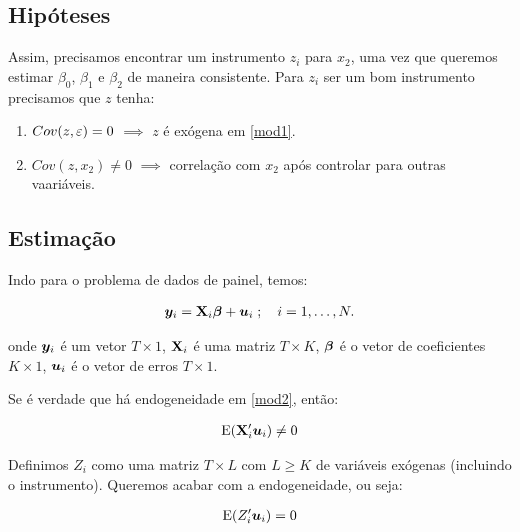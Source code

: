 \documentclass[11pt, oneside, a4paper, article]{article}
\numberwithin{equation}{section}
\begin{document}
\begin{description}
\begin{description}
\subsection*{Hipóteses}

Assim, precisamos encontrar um instrumento $z_{i}$ para $x_{2}$, uma vez que queremos estimar $\beta_{0}$, $\beta_{1}$ e $\beta_{2}$ de maneira consistente.
Para $z_{i}$ ser um bom instrumento precisamos que $z$ tenha:

\begin{enumerate}\itemsep0pt
\item $Cov(z, \varepsilon) = 0$ $\implies$  $z$ é exógena em \eqref{mod1}.
\item $Cov(z, x_{2}) \neq 0$ $\implies$  correlação com $x_{2}$ após controlar para outras vaariáveis.
\end{enumerate}

\subsection*{Estimação}

Indo para o problema de dados de painel, temos:

\vspace{-1 em}
\begin{align} \label{mod2}
	\boldsymbol{y}_{i} = \mathbf{X}_{i} \boldsymbol{\beta} + \boldsymbol{u}_{i}
	\; ; \quad i = 1, \dots, N.
\end{align}

\noindent
onde 
$\boldsymbol{y}_{i}$ é um vetor $T \times 1$,
$\mathbf{X}_{i}$ é uma matriz $T \times K$,
$\boldsymbol{\beta}$ é o vetor de coeficientes $K \times 1$,
$\boldsymbol{u}_{i}$ é o vetor de erros $T \times 1$.

Se é verdade que há endogeneidade em \eqref{mod2}, então:

\vspace{-1 em}
\begin{align*}
	\text{E}(\mathbf{X}_{i}^{\prime} \boldsymbol{u}_{i}) \neq 0
\end{align*}

Definimos $Z_{i}$ como uma matriz $T \times L$ com $L \geq K$ de variáveis exógenas (incluindo o instrumento).
Queremos acabar com a endogeneidade, ou seja:

\vspace{-1 em}
\begin{align*}
	\text{E}(Z_{i}^{\prime} \boldsymbol{u}_{i}) = 0
\end{align*}


\end{description}
\end{description}
\end{document}
